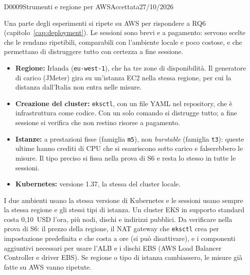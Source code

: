 \begin{decisione}{D0009}{Strumenti e regione per AWS}{Accettata}{27/10/2026}

\contesto
Una parte degli esperimenti si ripete su AWS per rispondere a RQ6 (capitolo~\ref{cap:deployment}). Le sessioni sono brevi e a pagamento: servono scelte che le rendano ripetibili, comparabili con l'ambiente locale e poco costose, e che permettano di distruggere tutto con certezza a fine sessione.

\scelta
\begin{itemize}
  \item \textbf{Regione:} Irlanda (\texttt{eu-west-1}), che ha tre zone di disponibilità. Il generatore di carico (JMeter) gira su un'istanza EC2 nella stessa regione, per cui la distanza dall'Italia non entra nelle misure.
  \item \textbf{Creazione del cluster:} \texttt{eksctl}, con un file YAML nel repository, che è infrastruttura come codice. Con un solo comando si distrugge tutto; a fine sessione si verifica che non restino risorse a pagamento.
  \item \textbf{Istanze:} a prestazioni fisse (famiglia \texttt{m5}), non \emph{burstable} (famiglia \texttt{t3}): queste ultime hanno crediti di CPU che si esauriscono sotto carico e falserebbero le misure. Il tipo preciso si fissa nella prova di S6 e resta lo stesso in tutte le sessioni.
  \item \textbf{Kubernetes:} versione 1.37, la stessa del cluster locale.
\end{itemize}

\conseguenze
I due ambienti usano la stessa versione di Kubernetes e le sessioni usano sempre la stessa regione e gli stessi tipi di istanza. Un cluster EKS in supporto standard costa 0,10~USD l'ora, più nodi, dischi e indirizzi pubblici. Da verificare nella prova di S6: il prezzo della regione, il NAT gateway che \texttt{eksctl} crea per impostazione predefinita e che costa a ore (si può disattivare), e i componenti aggiuntivi necessari per usare l'ALB e i dischi EBS (AWS Load Balancer Controller e driver EBS). Se regione o tipo di istanza cambiassero, le misure già fatte su AWS vanno ripetute.

\end{decisione}
